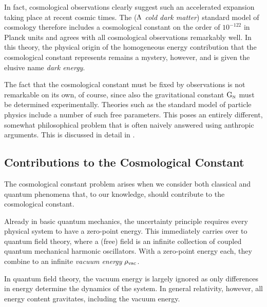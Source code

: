 \documentclass[12pt,parskip=half]{scrreprt}
\newcommand{\addref}{\todo[color=black!20]{ref.}}
\begin{document}
In fact, cosmological observations clearly suggest such an accelerated expansion taking place at recent cosmic times. \addref The \LCDM (\emph{\(\Lambda\) cold dark matter}) standard model of cosmology therefore includes a cosmological constant on the order of \(10^{-122}\) in Planck units and agrees with all  cosmological observations remarkably well. In this theory, the physical origin of the homogeneous energy contribution that the cosmological constant represents remains a mystery, however, and is given the elusive  name \emph{dark energy}. \addref

The fact that the cosmological constant must be fixed by observations is not remarkable on its own, of course, since also the gravitational constant \(\mathrm{G}_\textnormal{\tiny{N}}\) must be determined experimentally. Theories such as the standard model of particle physics include a number of such free parameters. This poses an entirely different, somewhat philosophical problem that is often naively answered using anthropic arguments. This is discussed in detail in .

\subsection{Contributions to the Cosmological Constant}\label{sec:cc_contrib}

The cosmological constant problem arises when we consider both classical and quantum phenomena that, to our knowledge, should contribute to the cosmological constant.

Already in basic quantum mechanics, the uncertainty principle requires every physical system to have a zero-point energy\addref. This immediately carries over to quantum field theory, where a (free) field is an infinite collection of coupled quantum mechanical harmonic oscillators. With a zero-point energy each, they combine to an infinite \emph{vacuum energy} \(\rho_\textnormal{vac}\). 
 
In quantum field theory, the vacuum energy is largely ignored as only differences in energy determine the dynamics of the system. In general relativity, however, all energy content gravitates, including the vacuum energy. \addref {}
\end{document}
